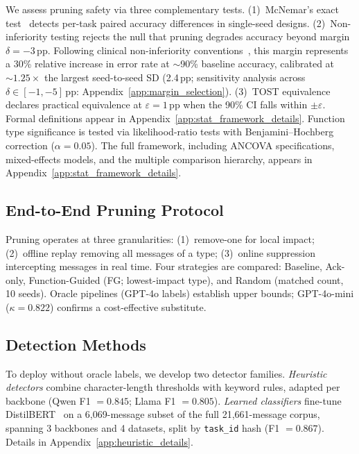 We assess pruning safety via three complementary tests. (1)~McNemar's exact test~\citep{mcnemar_1947} detects per-task paired accuracy differences in single-seed designs. (2)~Non-inferiority testing rejects the null that pruning degrades accuracy beyond margin $\delta = -3$\,pp. Following clinical non-inferiority conventions~\citep{lakens_equivalence_2017}, this margin represents a 30\% relative increase in error rate at ${\sim}$90\% baseline accuracy, calibrated at ${\sim}1.25\times$ the largest seed-to-seed SD (2.4\,pp; sensitivity analysis across $\delta \in [-1, -5]$\,pp: Appendix~\ref{app:margin_selection}). (3)~TOST equivalence~\citep{schuirmann_tost_1987} declares practical equivalence at $\varepsilon = 1$\,pp when the 90\% CI falls within $\pm\varepsilon$. Formal definitions appear in Appendix~\ref{app:stat_framework_details}.
Function type significance is tested via likelihood-ratio tests with Benjamini--Hochberg correction ($\alpha = 0.05$). The full framework, including ANCOVA specifications, mixed-effects models, and the multiple comparison hierarchy, appears in Appendix~\ref{app:stat_framework_details}.

\subsection{End-to-End Pruning Protocol}
\label{sec:pruning_protocol}

Pruning operates at three granularities: (1)~remove-one for local impact; (2)~offline replay removing all messages of a type; (3)~online suppression intercepting messages in real time. Four strategies are compared: Baseline, Ack-only, Function-Guided (FG; lowest-impact type), and Random (matched count, 10 seeds). Oracle pipelines (GPT-4o labels) establish upper bounds; GPT-4o-mini ($\kappa = 0.822$) confirms a cost-effective substitute.

\subsection{Detection Methods}
\label{sec:heuristic}
\label{sec:learned_classifier}

To deploy without oracle labels, we develop two detector families. \emph{Heuristic detectors} combine character-length thresholds with keyword rules, adapted per backbone (Qwen F1 $= 0.845$; Llama F1 $= 0.805$). \emph{Learned classifiers} fine-tune DistilBERT~\citep{sanh_distilbert_2019} on a 6{,}069-message subset of the full 21{,}661-message corpus, spanning 3 backbones and 4 datasets, split by \texttt{task\_id} hash (F1 $= 0.867$). Details in Appendix~\ref{app:heuristic_details}.

